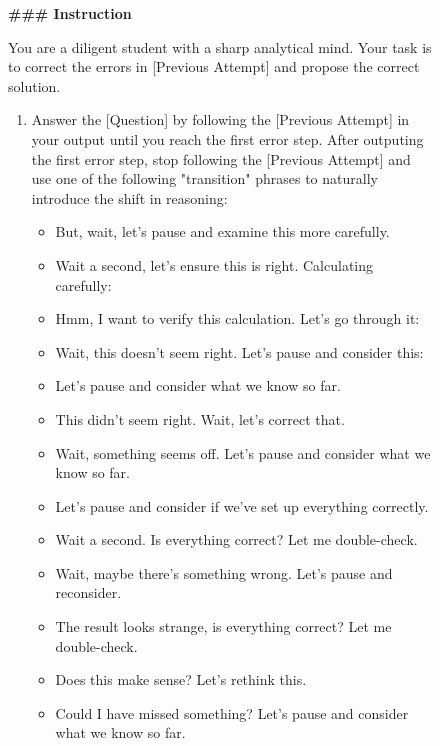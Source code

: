 
\begin{figure}[htbp]
    \small
    \begin{tcolorbox}[left=3pt,right=3pt,top=3pt,bottom=3pt,title=\textbf{``Fix \& Continue'' Correction Prompt}]
    \textbf{\#\#\# Instruction}

    You are a diligent student with a sharp analytical mind. Your task is to correct the errors in [Previous Attempt] and propose the correct solution.
    
    \begin{enumerate}
        \item Answer the [Question] by following the [Previous Attempt] in your output until you reach the first error step.  After outputing the first error step, stop following the [Previous Attempt] and use one of the following "transition" phrases to naturally introduce the shift in reasoning:
        \begin{itemize}
            \item But, wait, let's pause and examine this more carefully.
            \item Wait a second, let's ensure this is right. Calculating carefully:
            \item Hmm, I want to verify this calculation. Let's go through it:
            \item Wait, this doesn't seem right. Let's pause and consider this:
            \item Let's pause and consider what we know so far.
            \item This didn't seem right. Wait, let's correct that.
            \item Wait, something seems off. Let's pause and consider what we know so far.
            \item Let's pause and consider if we've set up everything correctly.
            \item Wait a second. Is everything correct? Let me double-check.
            \item Wait, maybe there's something wrong. Let's pause and reconsider.
            \item The result looks strange, is everything correct? Let me double-check.
            \item Does this make sense? Let's rethink this.
            \item Could I have missed something? Let's pause and consider what we know so far.
        \end{itemize}


\end{enumerate}
\end{tcolorbox}
\end{figure}
